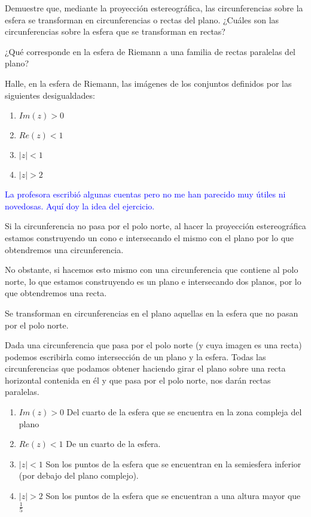 \begin{problem}[2]
\ppart
Demuestre que, mediante la proyección estereográfica, las circunferencias sobre la esfera se transforman en circunferencias o rectas del plano. ¿Cuáles son las circunferencias sobre la esfera que se transforman en rectas?

\ppart
¿Qué corresponde en la esfera de Riemann a una familia de rectas paralelas del plano?

\ppart
Halle, en la esfera de Riemann, las imágenes de los conjuntos definidos por las siguientes desigualdades:
\begin{enumerate}
\item $Im(z) > 0$
\item $Re(z) < 1$
\item $|z| < 1$
\item $|z| > 2$
\end{enumerate}

\solution

\textcolor{blue}{La profesora escribió algunas cuentas pero no me han parecido muy útiles ni novedosas. Aquí doy la idea del ejercicio.}

\spart

Si la circunferencia no pasa por el polo norte, al hacer la proyección estereográfica estamos construyendo un cono e intersecando el mismo con el plano por lo que obtendremos una circunferencia.

No obstante, si hacemos esto mismo con una circunferencia que contiene al polo norte, lo que estamos construyendo es un plano e intersecando dos planos, por lo que obtendremos una recta.

Se transforman en circunferencias en el plano aquellas en la esfera que no pasan por el polo norte.

\spart
Dada una circunferencia que pasa por el polo norte (y cuya imagen es una recta) podemos escribirla como intersección de un plano y la esfera. Todas las circunferencias que podamos obtener haciendo girar el plano sobre una recta horizontal contenida en él y que pasa por el polo norte, nos darán rectas paralelas.

\spart
\begin{enumerate}
\item $Im(z) > 0$
Del cuarto de la esfera que se encuentra en la zona compleja del plano

\item $Re(z) < 1$
De un cuarto de la esfera.

\item $|z| < 1$
Son los puntos de la esfera que se encuentran en la semiesfera inferior (por debajo del plano complejo).

\item $|z| > 2$
Son los puntos de la esfera que se encuentran a una altura mayor que $\frac{1}{5}$
\end{enumerate}

\end{problem}

